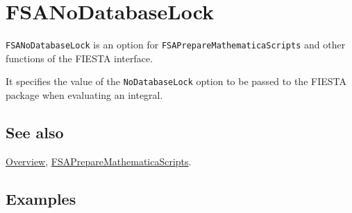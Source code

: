 \documentclass[../FeynHelpersManual.tex]{subfiles}
\begin{document}
\begin{Shaded}
\begin{Highlighting}[]
 
\end{Highlighting}
\end{Shaded}

\hypertarget{fsanodatabaselock}{
\section{FSANoDatabaseLock}\label{fsanodatabaselock}}

\texttt{FSANoDatabaseLock} is an option for
\texttt{FSAPrepareMathematicaScripts} and other functions of the FIESTA
interface.

It specifies the value of the \texttt{NoDatabaseLock} option to be
passed to the FIESTA package when evaluating an integral.

\subsection{See also}

\hyperlink{toc}{Overview},
\hyperlink{fsapreparemathematicascripts}{FSAPrepareMathematicaScripts}.

\subsection{Examples}
\end{document}
